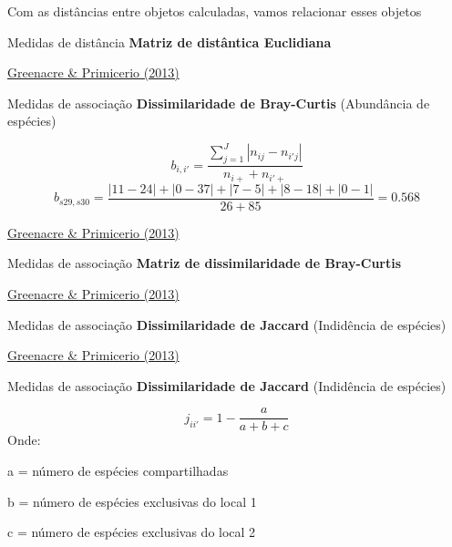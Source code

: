 \documentclass[
  ignorenonframetext,
]{beamer}
\begin{document}
\begin{frame}{Com as distâncias entre objetos calculadas, vamos
relacionar esses objetos}
\protect\hypertarget{com-as-distuxe2ncias-entre-objetos-calculadas-vamos-relacionar-esses-objetos}{}
\begin{block}{Medidas de distância}
\protect\hypertarget{medidas-de-distuxe2ncia-5}{}
\textbf{Matriz de distântica Euclidiana}

\href{https://www.fbbva.es/microsite/multivariate-statistics/}{Greenacre
\& Primicerio (2013)}
\end{block}

\begin{block}{Medidas de associação}
\protect\hypertarget{medidas-de-associauxe7uxe3o}{}
\textbf{Dissimilaridade de Bray-Curtis} (Abundância de espécies)

\[b_{i,i'} = \frac{\sum_{j = 1}^{J}{|n_{ij} - n_{i'j}|}}{n_{i+} + n_{i'+}}\]
\[b_{s29,s30} = \frac{|11 - 24| + |0 - 37| + |7 - 5| + |8 - 18| + |0 - 1|}{26 + 85} = 0.568\]

\href{https://www.fbbva.es/microsite/multivariate-statistics/}{Greenacre
\& Primicerio (2013)}
\end{block}

\begin{block}{Medidas de associação}
\protect\hypertarget{medidas-de-associauxe7uxe3o-1}{}
\textbf{Matriz de dissimilaridade de Bray-Curtis}

\href{https://www.fbbva.es/microsite/multivariate-statistics/}{Greenacre
\& Primicerio (2013)}
\end{block}

\begin{block}{Medidas de associação}
\protect\hypertarget{medidas-de-associauxe7uxe3o-2}{}
\textbf{Dissimilaridade de Jaccard} (Indidência de espécies)

\href{https://www.fbbva.es/microsite/multivariate-statistics/}{Greenacre
\& Primicerio (2013)}
\end{block}

\begin{block}{Medidas de associação}
\protect\hypertarget{medidas-de-associauxe7uxe3o-3}{}
\textbf{Dissimilaridade de Jaccard} (Indidência de espécies)

\[j_{ii'} = 1 - \frac{a}{a + b + c}\] Onde:

a = número de espécies compartilhadas

b = número de espécies exclusivas do local 1

c = número de espécies exclusivas do local 2


\end{block}
\end{frame}
\end{document}

